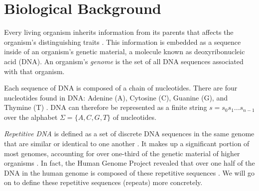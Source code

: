 \section{Biological Background}
Every living organism inherits information from its parents that affects the organism's distinguishing traits \cite{lewin2014lewins}. This information is embedded as a sequence inside of an organism's genetic material, a molecule known as deoxyribonucleic acid (DNA). An organism's \textit{genome} is the set of all DNA sequences associated with that organism.

Each sequence of DNA is composed of a chain of nucleotides. There are four nucleotides found in DNA: Adenine (A), Cytosine (C), Guanine (G), and Thymine (T)  \cite{elloumi2011algorithms}. DNA can therefore be represented as a finite string $s=s_{0}s_{1}...s_{n-1}$ over the alphabet $\Sigma=\lbrace A, C, G, T\rbrace$ of nucleotides.

\textit{Repetitive DNA} is defined as a set of discrete DNA sequences in the same genome that are similar or identical to one another \cite{treangen2012repetitive}. It makes up a significant portion of most genomes, accounting for over one-third of the genetic material of higher organisms \cite{britten1968repeated}. In fact, the Human Genome Project revealed that over one half of the DNA in the human genome is composed of these repetitive sequences \cite{lander2001initial}. We will go on to define these repetitive sequences (repeats) more concretely. 
  
 


